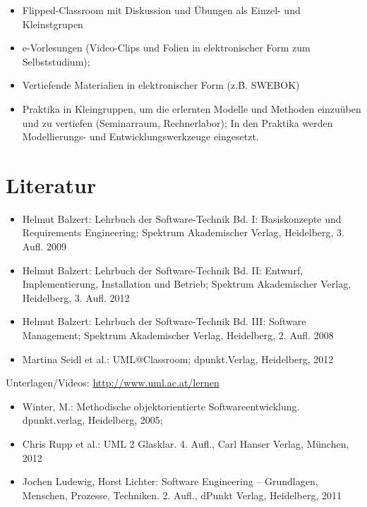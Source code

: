 \begin{itemize}
\tightlist
\item
  Flipped-Classroom mit Diskussion und Übungen als Einzel- und
  Kleinstgrupen
\item
  e-Vorlesungen (Video-Clips und Folien in elektronischer Form zum
  Selbststudium);
\item
  Vertiefende Materialien in elektronischer Form (z.B. SWEBOK)
\item
  Praktika in Kleingruppen, um die erlernten Modelle und Methoden
  einzuüben und zu vertiefen (Seminarraum, Rechnerlabor); In den
  Praktika werden Modellierungs- und Entwicklungswerkzeuge eingesetzt.
\end{itemize}

\section*{Literatur\label{/mi-2017/modulbeschreibungen-bachelor/BA_Softwaretechnik}}\label{literaturpathlabelmi-2017modulbeschreibungen-bachelorbaux5fsoftwaretechnik}

\begin{itemize}
\tightlist
\item
  Helmut Balzert: Lehrbuch der Software-Technik Bd. I: Basiskonzepte und
  Requirements Engineering; Spektrum Akademischer Verlag, Heidelberg, 3.
  Aufl. 2009
\item
  Helmut Balzert: Lehrbuch der Software-Technik Bd. II: Entwurf,
  Implementierung, Installation und Betrieb; Spektrum Akademischer
  Verlag, Heidelberg, 3. Aufl. 2012
\item
  Helmut Balzert: Lehrbuch der Software-Technik Bd. III: Software
  Management; Spektrum Akademischer Verlag, Heidelberg, 2. Aufl. 2008
\item
  Martina Seidl et al.: UML@Classroom; dpunkt.Verlag, Heidelberg, 2012
\end{itemize}

Unterlagen/Videos: \url{http://www.uml.ac.at/lernen}

\begin{itemize}
\tightlist
\item
  Winter, M.: Methodische objektorientierte Softwareentwicklung.
  dpunkt.verlag, Heidelberg, 2005;
\item
  Chris Rupp et al.: UML 2 Glasklar. 4. Aufl., Carl Hanser Verlag,
  München, 2012
\item
  Jochen Ludewig, Horst Lichter: Software Engineering -- Grundlagen,
  Menschen, Prozesse, Techniken. 2. Aufl., dPunkt Verlag, Heidelberg,
  2011
\end{itemize}

